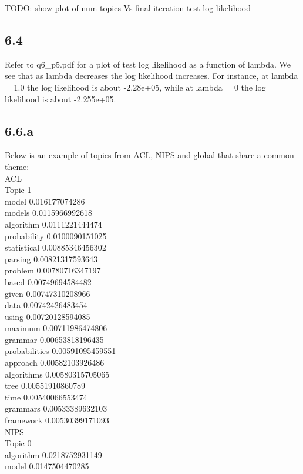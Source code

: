 \documentclass{article}
\begin{document}
{TODO: show plot of num topics Vs final iteration test log-likelihood

\subsection*{6.4}

Refer to q6_p5.pdf for a plot of test log likelihood as a function of lambda. We see that as lambda decreases the log likelihood
increases. For instance, at lambda = 1.0 the log likelihood is about -2.28e+05, while at lambda = 0 the log likelihood is about
-2.255e+05.

\subsection*{6.6.a}
Below is an example of topics from ACL, NIPS and global that share a common theme:\\
ACL\\
Topic 1\\
model 0.016177074286\\
models 0.0115966992618\\
algorithm 0.0111221444474\\
probability 0.0100090151025\\
statistical 0.00885346456302\\
parsing 0.00821317593643\\
problem 0.00780716347197\\
based 0.00749694584482\\
given 0.00747310208966\\
data 0.00742426483454\\
using 0.00720128594085\\
maximum 0.00711986474806\\
grammar 0.00653818196435\\
probabilities 0.00591095459551\\
approach 0.00582103926486\\
algorithms 0.00580315705065\\
tree 0.00551910860789\\
time 0.00540066553474\\
grammars 0.00533389632103\\
framework 0.00530399171093\\
NIPS\\
Topic 0\\
algorithm 0.0218752931149\\
model 0.0147504470285\\
}
\end{document}
